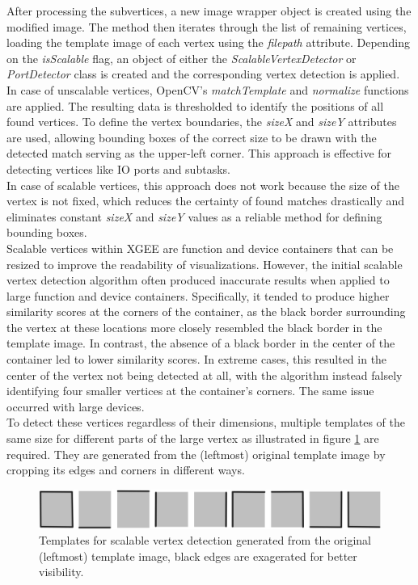 After processing the subvertices, a new image wrapper object is created using the modified image. The method then iterates through the list of remaining vertices, loading the template image of each vertex using the \textit{filepath} attribute. Depending on the \textit{isScalable} flag, an object of either the \textit{ScalableVertexDetector} or \textit{PortDetector} class is created and the corresponding vertex detection is applied.\\
In case of unscalable vertices, OpenCV's \textit{matchTemplate} and \textit{normalize} functions are applied. The resulting data is thresholded to identify the positions of all found vertices. To define the vertex boundaries, the \textit{sizeX} and \textit{sizeY} attributes are used, allowing bounding boxes of the correct size to be drawn with the detected match serving as the upper-left corner. This approach is effective for detecting vertices like IO ports and subtasks.\\
In case of scalable vertices, this approach does not work because the size of the vertex is not fixed, which reduces the certainty of found matches drastically and eliminates constant \textit{sizeX} and \textit{sizeY} values as a reliable method for defining bounding boxes.\\
Scalable vertices within XGEE are function and device containers that can be resized to improve the readability of visualizations. However, the initial scalable vertex detection algorithm often produced inaccurate results when applied to large function and device containers. Specifically, it tended to produce higher similarity scores at the corners of the container, as the black border surrounding the vertex at these locations more closely resembled the black border in the template image. In contrast, the absence of a black border in the center of the container led to lower similarity scores. In extreme cases, this resulted in the center of the vertex not being detected at all, with the algorithm instead falsely identifying four smaller vertices at the container's corners. The same issue occurred with large devices.\\
To detect these vertices regardless of their dimensions, multiple templates of the same size for different parts of the large vertex as illustrated in figure \ref{fig_templates} are required. They are generated from the (leftmost) original template image by cropping its edges and corners in different ways.
\begin{figure}[h]
    \centering
    \includegraphics[width=0.85\linewidth]{Pictures/templates.png}
    \caption{Templates for scalable vertex detection generated from the original (leftmost) template image, black edges are exagerated for better visibility.}
    \label{fig_templates}
\end{figure}
